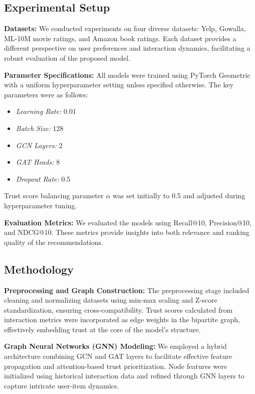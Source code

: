 \documentclass{article} %
\begin{document}
\subsection{Experimental Setup}

\textbf{Datasets:} We conducted experiments on four diverse datasets: Yelp, Gowalla, ML-10M movie ratings, and Amazon book ratings. Each dataset provides a different perspective on user preferences and interaction dynamics, facilitating a robust evaluation of the proposed model.

\textbf{Parameter Specifications:} All models were trained using PyTorch Geometric with a uniform hyperparameter setting unless specified otherwise. The key parameters were as follows:
\begin{itemize}
    \item \textit{Learning Rate:} 0.01
    \item \textit{Batch Size:} 128
    \item \textit{GCN Layers:} 2
    \item \textit{GAT Heads:} 8
    \item \textit{Dropout Rate:} 0.5
\end{itemize}
Trust score balancing parameter \(\alpha\) was set initially to 0.5 and adjusted during hyperparameter tuning.

\textbf{Evaluation Metrics:} We evaluated the models using Recall@10, Precision@10, and NDCG@10. These metrics provide insights into both relevance and ranking quality of the recommendations.

\subsection{Methodology}

\textbf{Preprocessing and Graph Construction:} The preprocessing stage included cleaning and normalizing datasets using min-max scaling and Z-score standardization, ensuring cross-compatibility. Trust scores calculated from interaction metrics were incorporated as edge weights in the bipartite graph, effectively embedding trust at the core of the model's structure.

\textbf{Graph Neural Networks (GNN) Modeling:} We employed a hybrid architecture combining GCN and GAT layers to facilitate effective feature propagation and attention-based trust prioritization. Node features were initialized using historical interaction data and refined through GNN layers to capture intricate user-item dynamics.
\end{document}
